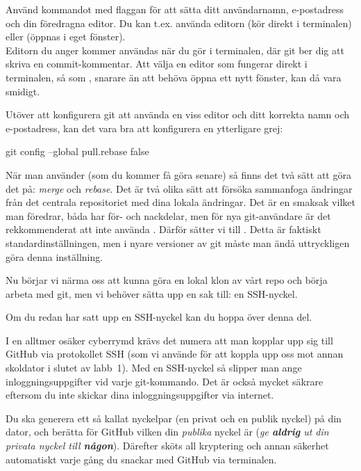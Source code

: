 \begin{Datorarbete}
	\code{[\ref{git-config}]} Använd kommandot  med flaggan  för att sätta ditt användarnamn, e-postadress och din föredragna editor. Du kan t.ex. använda editorn  (kör direkt i terminalen) eller  (öppnas i eget fönster).
	\\

	Editorn du anger kommer användas när du gör  i terminalen, där git ber dig att skriva en commit-kommentar. Att välja en editor som fungerar direkt i terminalen, så som , snarare än att behöva öppna ett nytt fönster, kan då vara smidigt.

	\item Utöver att konfigurera git att använda en viss editor och ditt korrekta namn och e-postadress, kan det vara bra att konfigurera en ytterligare grej:
	\begin{Code}
		git config --global pull.rebase false
	\end{Code}
	När man använder  (som du kommer få göra senare) så finns det två sätt att göra det på: \emph{merge} och \emph{rebase}. Det är två olika sätt att försöka sammanfoga ändringar från det centrala repositoriet med dina lokala ändringar. Det är en smaksak vilket man föredrar, båda har för- och nackdelar, men för nya git-användare är det rekkommenderat att inte använda . Därför sätter vi  till . Detta är faktiskt standardinställningen, men i nyare versioner av git måste man ändå uttryckligen göra denna inställning.

	\item Nu börjar vi närma oss att kunna göra en lokal klon av vårt repo och börja arbeta med git, men vi behöver sätta upp en sak till: en SSH-nyckel.

	\halfblankline
	Om du redan har satt upp en SSH-nyckel kan du hoppa över denna del.
	\halfblankline

	\noindent I en alltmer osäker cyberrymd krävs det numera att man kopplar upp sig till GitHub via protokollet SSH (som vi använde för att koppla upp oss mot annan skoldator i slutet av labb~1). Med en SSH-nyckel så slipper man ange inloggningsuppgifter vid varje git-kommando. Det är också mycket säkrare eftersom du inte skickar dina inloggningsuppgifter via internet.

	Du ska generera ett så kallat nyckelpar (en privat och en publik nyckel) på din dator, och berätta för GitHub vilken din \emph{publika} nyckel är (\emph{ge \textbf{aldrig} ut din privata nyckel till \textbf{någon}}). Därefter sköts all kryptering och annan säkerhet automatiskt varje gång du snackar med GitHub via terminalen.



\end{Datorarbete}

